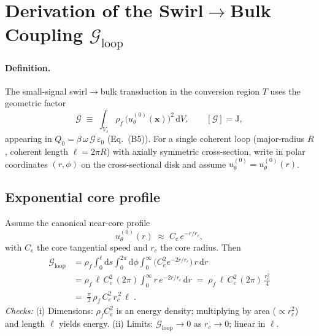 \documentclass[10pt,reprint,aps,onecolumn,nofootinbib]{revtex4-2}
\begin{document}

    \section{Derivation of the Swirl$\to$Bulk Coupling \texorpdfstring{$\mathcal{G}_{\text{loop}}$}{G\_loop}}
    \label{app:Gloop}

    \paragraph{Definition.}
        The small-signal swirl$\to$bulk transduction in the conversion region $T$ uses the geometric factor
        \begin{equation}
            \mathcal{G}\;\equiv\;\int_{V_s}\rho_f\,\big(u_\theta^{(0)}(\mathbf{x})\big)^2\,\mathrm{d}V,
            \qquad [\mathcal{G}]=\mathrm{J},
            \label{eq:A1}
        \end{equation}
        appearing in $Q_0=\beta\,\omega\,\mathcal{G}\,\varepsilon_0$ (Eq.~\textup{(B5)}). For a single coherent loop (major-radius $R$, coherent length $\ell=2\pi R$) with axially symmetric cross-section, write in polar coordinates $(r,\phi)$ on the cross-sectional disk and assume $u_\theta^{(0)}=u_\theta^{(0)}(r)$.

    \subsection*{Exponential core profile}
    Assume the canonical near-core profile
    \begin{equation}
        u_\theta^{(0)}(r)\;\approx\;C_e\,e^{-r/r_c},
        \label{eq:A2}
    \end{equation}
    with $C_e$ the core tangential speed and $r_c$ the core radius. Then
    \begin{align}
        \mathcal{G}_{\text{loop}}
        &= \rho_f \int_0^\ell\!\mathrm{d}s\!\int_0^{2\pi}\!\mathrm{d}\phi\!\int_0^\infty\!\big(C_e^2 e^{-2r/r_c}\big)\,r\,\mathrm{d}r
        \label{eq:A3}\\[3pt]
        &= \rho_f\,\ell\,C_e^2\,(2\pi)\int_0^\infty r\,e^{-2r/r_c}\,\mathrm{d}r
        \;=\; \rho_f\,\ell\,C_e^2\,(2\pi)\,\frac{r_c^2}{4}\nonumber\\[2pt]
        &=\boxed{\;\frac{\pi}{2}\,\rho_f\,C_e^2\,r_c^{\,2}\,\ell\;}.
        \label{eq:A4}
    \end{align}
    \emph{Checks:} (i) Dimensions: $\rho_f C_e^2$ is an energy density; multiplying by area ($\propto r_c^2$) and length $\ell$ yields energy. (ii) Limits: $\mathcal{G}_{\text{loop}}\to 0$ as $r_c\to 0$; linear in $\ell$.
\end{document}
